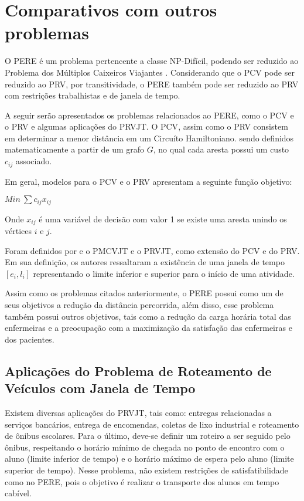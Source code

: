 \section{\esp Comparativos com outros problemas } \label{aplicacoes}

O \ac{PERE} é um problema pertencente a classe NP-Difícil, podendo ser reduzido ao Problema dos Múltiplos Caixeiros Viajantes . Considerando que o \ac{PCV} pode ser reduzido ao \ac{PRV}, por transitividade, o \ac{PERE} também pode ser reduzido ao \ac{PRV} com restrições trabalhistas e de janela de tempo. 

A seguir serão apresentados os problemas relacionados ao \ac{PERE}, como o \ac{PCV} e o \ac{PRV} e algumas aplicações do \ac{PRVJT}. O \ac{PCV}, assim como o \ac{PRV} consistem em determinar a menor distância em um Circuíto Hamiltoniano. sendo definidos matematicamente  a partir de um grafo $G$, no qual cada aresta possui um custo $c_{ij}$ associado.

Em geral, modelos para o \ac{PCV} e o \ac{PRV} apresentam a seguinte função objetivo:

\begin{center}
$Min~\sum c_{ij}x_{ij}$
\end{center}

Onde $x_{ij}$ é uma variável de decisão com valor 1 se existe uma aresta unindo os vértices $i$ e $j$.

Foram definidos por  e  o \ac{PMCVJT} e o \ac{PRVJT}, como extensão do \ac{PCV} e do \ac{PRV}.
Em sua definição, os autores ressaltaram a existência de uma janela de tempo $[e_i, l_i]$ representando o limite inferior e superior para o início de uma atividade.

Assim como os problemas citados anteriormente, o \ac{PERE} possui como um de seus objetivos a redução da distância percorrida, além disso, esse problema também possui outros objetivos, tais como a redução da carga horária total das enfermeiras e a preocupação com a maximização da satisfação das enfermeiras e dos pacientes.

\subsection{Aplicações do Problema de Roteamento de Veículos com Janela de Tempo}

Existem diversas aplicações do \ac{PRVJT}, tais como: entregas relacionadas a serviços bancários, entrega de encomendas, coletas de lixo industrial e roteamento de ônibus escolares. Para o último, deve-se definir um roteiro a ser seguido pelo ônibus, respeitando o horário mínimo de chegada no ponto de encontro com o aluno (limite inferior de tempo) e o horário máximo de espera pelo aluno (limite superior de tempo). Nesse problema, não existem restrições de satisfatibilidade como no \ac{PERE}, pois o objetivo é realizar o transporte dos alunos em tempo cabível.